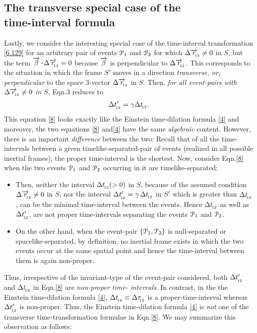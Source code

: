 \subsection{The transverse special case of the\\   
time-interval formula}
Lastly, we consider the interesting special case of 
the 
time-interval transformation \eqref{6.129} for an 
arbitrary 
pair 
of   events $\EuScript{P}_1$ and $\EuScript{P}_2$ for 
which 
$\Delta \overrightarrow{r}_{_{\hspace*{-1.5pt}{\negthinspace\negthinspace 12}}} \neq 0 $ in $S$, but the 
term 
$\veca{\gkb}\,\dotp\Delta \veca{r}_\sfx{\nnt 12} = 0 $ 
because 
$ 
\overrightarrow{{\beta}}$ is perpendicular to $\Delta 
\overrightarrow{r}_{_{\hspace*{-1.5pt}{\negthinspace\negthinspace 
12}}}$. This corresponds to the situation in which the 
frame  
$S'$ moves in a direction \textsl{transverse, or, 
perpendicular} to the space 3-vector $\Delta 
\overrightarrow{r}_{_{\hspace*{-1.5pt}{\negthinspace\negthinspace 12}}}$ in $S$. Then, \textsl{for all 
event-pairs with $\Delta \overrightarrow{r}_{_{\hspace*{-1.5pt}{\negthinspace\negthinspace 12}}} \neq 0 
$ in 
$S$}, Eqn.{3} reduces to
\begin{align}\label{8}
\Delta t'_{_{\hspace*{-1.5pt}{12}}}  ={\gamma}\Delta t_{_{\hspace*{-1.5pt}{12}}}.
\end{align}
This equation \eqref{8} looks exactly like the 
Einstein 
time-dilation formula \eqref{4} and moreover, the two 
equations \eqref{8} and\break \eqref{4} have the same 
\textsl{algebraic} content. However, there is an 
important 
\textsl{difference} between the two: Recall that {of 
all 
the 
time-intervals between a given  timelike-separated-pair 
of 
events (realized in all possible inertial frames), the 
proper time-interval is the shortest}. Now, consider 
Eqn.\eqref{8} when the two events $\EuScript{P}_1$ and 
$\EuScript{P}_2$ occurring in it are 
timelike-separated:

\begin{itemize}
\item Then, neither the interval $\Delta t_{_{\hspace*{-1.5pt}{12}}} 
(>0) $ 
in $S$, because of the assumed condition $\Delta 
\overrightarrow{r}_{_{\hspace*{-1.5pt}{\negthinspace\negthinspace 12}}} \neq 0$  in $S$, nor the 
interval 
$\Delta t'_{_{\hspace*{-1.5pt}{12}}} ={\gamma}\,\Delta t_{_{\hspace*{-1.5pt}{12}}}$ in $S'$ 
which is greater than $\Delta t_{_{\hspace*{-1.5pt}{12}}}$, can be the 
minimal time-interval between the events. Hence 
$\Delta 
t_{_{\hspace*{-1.5pt}{12}}}$ as well as $\Delta t'_{_{\hspace*{-1.5pt}{12}}}$,  are not  
proper time-intervals separating the events 
$\EuScript{P}_1$ and $\EuScript{P}_2$.

\item On the other hand, when the event-pair 
$\{\EuScript{P}_1, \EuScript{P}_2\}$ is null-separated 
or 
spacelike-separated, by definition, no inertial frame 
exists 
in which the two events occur at the same spatial point 
and 
hence the time-interval between them is again 
non-proper.

\end{itemize}
Thus, irrespective of the invariant-type of the 
event-pair 
considered, both $\Delta t'_{_{\hspace*{-1.5pt}{12}}}$  and $\Delta 
t_{_{\hspace*{-1.5pt}{12}}}$ in Eqn.\eqref{8} are  \textsl{non-proper 
time- 
intervals}. In contrast, in the the Einstein 
time-dilation 
formula  \eqref{4},  $\Delta t_{_{\hspace*{-1.5pt}{12}}} \equiv 
\Delta\tau_{_{\hspace*{-1.5pt}{12}}}$ is a proper-time-interval  
whereas 
$\Delta t'_{_{\hspace*{-1.5pt}{12}}}$ is non-proper. Thus, the Einstein 
time-dilation formula \eqref{4} is \textsl{not} one of 
the 
transverse time-transformation formulae in  
Eqn.\eqref{8}. 
We may summarize this observation as follows:

